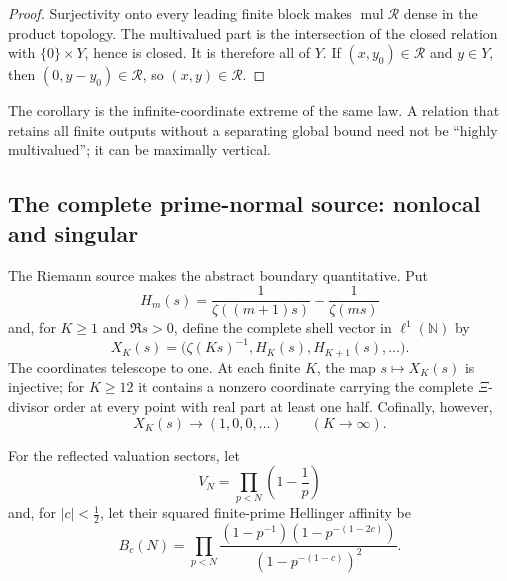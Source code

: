 \documentclass[11pt]{article}
\theoremstyle{definition}
\theoremstyle{remark}
\newcommand{\N}{\mathbb N}
\begin{document}
\begin{proof}
Surjectivity onto every leading finite block makes
\(\operatorname{mul}\mathcal R\) dense in the product topology.  The
multivalued part is the intersection of the closed relation with
\(\{0\}\times Y\), hence is closed.  It is therefore all of \(Y\).  If
\((x,y_0)\in\mathcal R\) and \(y\in Y\), then
\((0,y-y_0)\in\mathcal R\), so \((x,y)\in\mathcal R\).
\end{proof}

The corollary is the infinite-coordinate extreme of the same law.  A
relation that retains all finite outputs without a separating global bound
need not be ``highly multivalued''; it can be maximally vertical.

\subsection{The complete prime-normal source: nonlocal and singular}
\label{subsec:nonlocal-singular}

The Riemann source makes the abstract boundary quantitative.  Put
\[
 H_m(s)=\frac1{\zeta((m+1)s)}-\frac1{\zeta(ms)}
\]
and, for \(K\ge1\) and \(\Re s>0\), define the complete shell vector in \(\ell^1(\N)\) by
\[
 X_K(s)=\bigl(\zeta(Ks)^{-1},H_K(s),H_{K+1}(s),\ldots\bigr).
\tag{4.2}\label{eq:complete-source-vector}
\]
The coordinates telescope to one.  At each finite \(K\), the map
\(s\mapsto X_K(s)\) is injective; for \(K\ge12\) it contains a nonzero
coordinate carrying the complete \(\Xi\)-divisor order at every point with
real part at least one half.  Cofinally, however,
\[
                    X_K(s)\longrightarrow (1,0,0,\ldots)
                    \qquad(K\to\infty).
\tag{4.3}\label{eq:cofinal-collapse}
\]

For the reflected valuation sectors, let
\[
 V_N=\prod_{p<N}\left(1-\frac1p\right)
\tag{4.4}\label{eq:wold-volume}
\]
and, for \(|c|<\tfrac12\), let their squared finite-prime Hellinger affinity
be
\[
 B_c(N)=\prod_{p<N}
 \frac{(1-p^{-1})(1-p^{-(1-2c)})}
      {(1-p^{-(1-c)})^2}.
\tag{4.5}\label{eq:hellinger-sector}
\]
\end{document}
